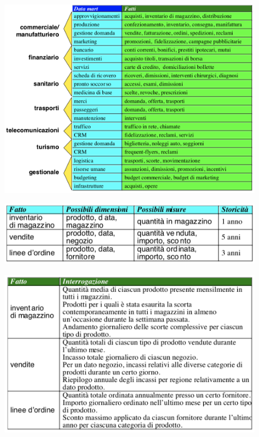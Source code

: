 \documentclass[a4paper, notitlepage, 9pt]{extreport}
\begin{document}
\begin{multicols}{2}
	\begin{figure}[H]
		\centering
		\includegraphics[scale=0.45]{Fatti}
	\end{figure}
	\columnbreak
	\begin{figure}[H]
		\centering
		\includegraphics[scale=0.38]{Requisiti}
	\end{figure}
	\begin{figure}[H]
		\centering
		\includegraphics[scale=0.38]{Preliminare}
	\end{figure}
\end{multicols}
\end{document}
